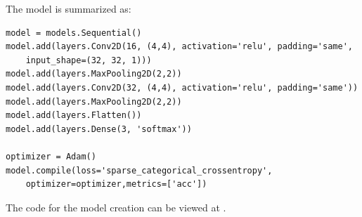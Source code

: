 The model is summarized as:

\begin{lstlisting}
model = models.Sequential()
model.add(layers.Conv2D(16, (4,4), activation='relu', padding='same',
    input_shape=(32, 32, 1)))
model.add(layers.MaxPooling2D(2,2))
model.add(layers.Conv2D(32, (4,4), activation='relu', padding='same'))
model.add(layers.MaxPooling2D(2,2))
model.add(layers.Flatten())
model.add(layers.Dense(3, 'softmax'))

optimizer = Adam()
model.compile(loss='sparse_categorical_crossentropy',
    optimizer=optimizer,metrics=['acc'])
\end{lstlisting}

The code for the model creation can be viewed at .
